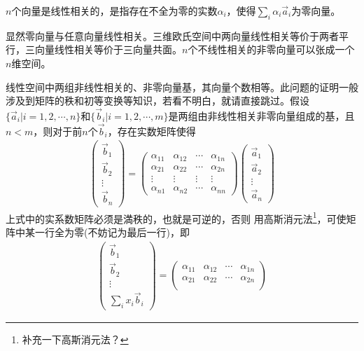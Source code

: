 \begin{example}
  $n$个向量是线性相关的，是指存在不全为零的实数$\alpha_i$，使得$\sum_i\alpha_i\vec a_i$为零向量。

  显然零向量与任意向量线性相关。三维欧氏空间中两向量线性相关等价于两者平行，三向量线性相关等价于三向量共面。$n$个不线性相关的非零向量可以张成一个$n$维空间。

  线性空间中两组非线性相关的、非零向量基，其向量个数相等。此问题的证明一般涉及到矩阵的秩和初等变换等知识，若看不明白，就请直接跳过。假设$\{\vec a_i|i=1,2,\cdots,n\}$和$\{\vec b_i|i=1,2,\cdots,m\}$是两组由非线性相关非零向量组成的基，且$n<m$，则对于前$n$个$\vec b_i$，存在实数矩阵使得
  \begin{align*}
    \begin{pmatrix}\vec b_1 \\ \vec b_2 \\ \vdots \\ \vec b_n\end{pmatrix}=
    \begin{pmatrix}
      \alpha_{11} & \alpha_{12} & \cdots & \alpha_{1n}\\
      \alpha_{21} & \alpha_{22} & \cdots & \alpha_{2n}\\
      \vdots      & \vdots      & \vdots & \vdots     \\
      \alpha_{n1} & \alpha_{n2} & \cdots & \alpha_{nn}
    \end{pmatrix}
    \begin{pmatrix}\vec a_1 \\ \vec a_2 \\ \vdots \\ \vec a_n\end{pmatrix}
  \end{align*}
  上式中的实系数矩阵必须是満秩的，也就是可逆的，否则%
  用高斯消元法\footnote{\color{red}补充一下高斯消元法？}，可使矩阵中某一行全为零(不妨记为最后一行)，即
  \begin{align*}
    \begin{pmatrix}\vec b_1 \\ \vec b_2 \\ \vdots \\ \sum_i x_i\vec b_i\end{pmatrix}=
    \begin{pmatrix}
      \alpha_{11} & \alpha_{12} & \cdots & \alpha_{1n}\\
      \alpha_{21} & \alpha_{22} & \cdots & \alpha_{2n}\\

\end{pmatrix}
\end{align*}
\end{example}
